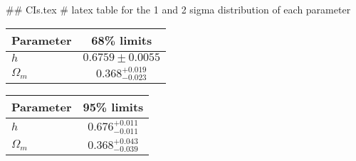 ## CIs.tex
# latex table for the 1 and 2 sigma distribution of each parameter

\begin{tabular} { l  c}
 Parameter &  68\% limits\\
\hline
{\boldmath$h              $} & $0.6759\pm 0.0055          $\\
{\boldmath$\Omega_m       $} & $0.368^{+0.019}_{-0.023}   $\\
\hline
\end{tabular}

\begin{tabular} { l  c}
 Parameter &  95\% limits\\
\hline
{\boldmath$h              $} & $0.676^{+0.011}_{-0.011}   $\\
{\boldmath$\Omega_m       $} & $0.368^{+0.043}_{-0.039}   $\\
\hline
\end{tabular}
